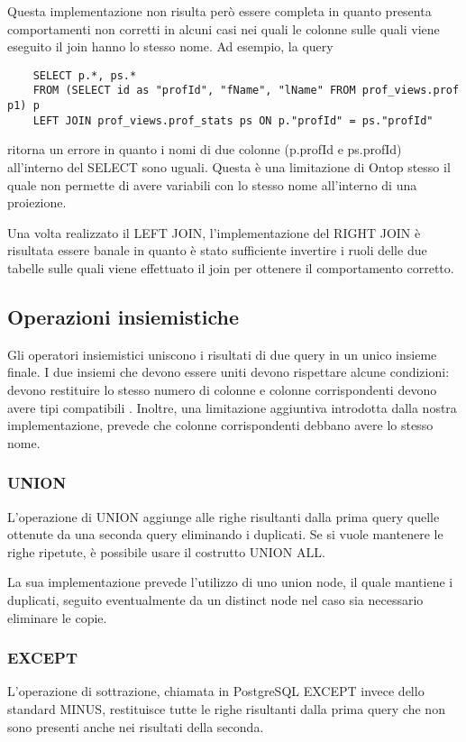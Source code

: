 Questa implementazione non risulta però essere completa in quanto presenta comportamenti non corretti in alcuni casi nei quali le colonne sulle quali viene eseguito il join hanno lo stesso nome.
Ad esempio, la query
\begin{verbatim}
    SELECT p.*, ps.*
    FROM (SELECT id as "profId", "fName", "lName" FROM prof_views.prof p1) p
    LEFT JOIN prof_views.prof_stats ps ON p."profId" = ps."profId"
\end{verbatim}
ritorna un errore in quanto i nomi di due colonne (p.profId e ps.profId) all'interno del SELECT sono uguali. Questa è una limitazione di Ontop stesso il quale non permette di avere variabili
con lo stesso nome all'interno di una proiezione.

Una volta realizzato il LEFT JOIN, l'implementazione del RIGHT JOIN è risultata essere banale in quanto è stato sufficiente invertire i ruoli delle due tabelle sulle quali viene effettuato
il join per ottenere il comportamento corretto.

\subsection{Operazioni insiemistiche}
Gli operatori insiemistici uniscono i risultati di due query in un unico insieme finale. I due insiemi che devono essere uniti devono rispettare alcune condizioni:
devono restituire lo stesso numero di colonne e colonne corrispondenti devono avere tipi compatibili \cite{PGSetOp}. Inoltre, una limitazione aggiuntiva introdotta dalla nostra
implementazione, prevede che colonne corrispondenti debbano avere lo stesso nome.

\subsubsection*{UNION}
L'operazione di UNION aggiunge alle righe risultanti dalla prima query quelle ottenute da una seconda query eliminando i duplicati. Se si vuole mantenere le righe ripetute, è possibile
usare il costrutto UNION ALL.

La sua implementazione prevede l'utilizzo di uno union node, il quale mantiene i duplicati, seguito eventualmente da un distinct node nel caso sia necessario eliminare le copie.

\subsubsection*{EXCEPT}
L'operazione di sottrazione, chiamata in PostgreSQL EXCEPT invece dello standard MINUS, restituisce tutte le righe risultanti dalla prima query che non sono presenti anche nei
risultati della seconda.

